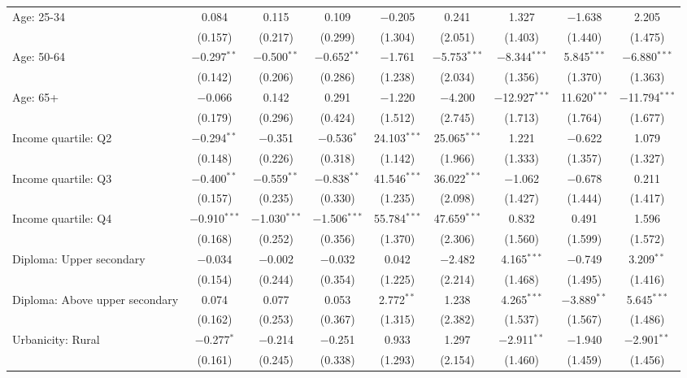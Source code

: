 \begin{tabular}{@{\extracolsep{5pt}}lcccccccc}
  Age: 25\mbox{-}34 & 0.084 & 0.115 & 0.109 & $-$0.205 & 0.241 & 1.327 & $-$1.638 & 2.205 \\ 
  & (0.157) & (0.217) & (0.299) & (1.304) & (2.051) & (1.403) & (1.440) & (1.475) \\ 
  Age: 50\mbox{-}64 & $-$0.297$^{**}$ & $-$0.500$^{**}$ & $-$0.652$^{**}$ & $-$1.761 & $-$5.753$^{***}$ & $-$8.344$^{***}$ & 5.845$^{***}$ & $-$6.880$^{***}$ \\ 
  & (0.142) & (0.206) & (0.286) & (1.238) & (2.034) & (1.356) & (1.370) & (1.363) \\ 
  Age: 65+ & $-$0.066 & 0.142 & 0.291 & $-$1.220 & $-$4.200 & $-$12.927$^{***}$ & 11.620$^{***}$ & $-$11.794$^{***}$ \\ 
  & (0.179) & (0.296) & (0.424) & (1.512) & (2.745) & (1.713) & (1.764) & (1.677) \\ 
  Income quartile: Q2 & $-$0.294$^{**}$ & $-$0.351 & $-$0.536$^{*}$ & 24.103$^{***}$ & 25.065$^{***}$ & 1.221 & $-$0.622 & 1.079 \\ 
  & (0.148) & (0.226) & (0.318) & (1.142) & (1.966) & (1.333) & (1.357) & (1.327) \\ 
  Income quartile: Q3 & $-$0.400$^{**}$ & $-$0.559$^{**}$ & $-$0.838$^{**}$ & 41.546$^{***}$ & 36.022$^{***}$ & $-$1.062 & $-$0.678 & 0.211 \\ 
  & (0.157) & (0.235) & (0.330) & (1.235) & (2.098) & (1.427) & (1.444) & (1.417) \\ 
  Income quartile: Q4 & $-$0.910$^{***}$ & $-$1.030$^{***}$ & $-$1.506$^{***}$ & 55.784$^{***}$ & 47.659$^{***}$ & 0.832 & 0.491 & 1.596 \\ 
  & (0.168) & (0.252) & (0.356) & (1.370) & (2.306) & (1.560) & (1.599) & (1.572) \\ 
  Diploma: Upper secondary & $-$0.034 & $-$0.002 & $-$0.032 & 0.042 & $-$2.482 & 4.165$^{***}$ & $-$0.749 & 3.209$^{**}$ \\ 
  & (0.154) & (0.244) & (0.354) & (1.225) & (2.214) & (1.468) & (1.495) & (1.416) \\ 
  Diploma: Above upper secondary & 0.074 & 0.077 & 0.053 & 2.772$^{**}$ & 1.238 & 4.265$^{***}$ & $-$3.889$^{**}$ & 5.645$^{***}$ \\ 
  & (0.162) & (0.253) & (0.367) & (1.315) & (2.382) & (1.537) & (1.567) & (1.486) \\ 
  Urbanicity: Rural & $-$0.277$^{*}$ & $-$0.214 & $-$0.251 & 0.933 & 1.297 & $-$2.911$^{**}$ & $-$1.940 & $-$2.901$^{**}$ \\ 
  & (0.161) & (0.245) & (0.338) & (1.293) & (2.154) & (1.460) & (1.459) & (1.456) \\ 

\end{tabular}
